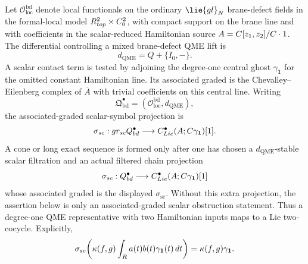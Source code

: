 \begin{defn}
\label{def:app-scalar-obstruction-complex}
  Let \(\mathcal O_{\mathrm{loc}}^{\mathrm{bd}}\) denote local
  functionals on the ordinary \(\lie{gl}_N\) brane-defect fields in the
  formal-local model
  \(R^2_{top}\times C^2_0\), with compact support on
  the brane line and with coefficients in the scalar-reduced Hamiltonian
  source \(A=C[z_1,z_2]/C\cdot1\).
  The differential controlling a mixed brane-defect QME lift is
  \[
    d_{\mathrm{QME}}=Q+\{I_0,-\}.
  \]
  A scalar contact term is tested by adjoining the degree-one central
  ghost \(\gamma_{\mathbf 1}\) for the omitted constant Hamiltonian
  line.  Its associated graded is the Chevalley--Eilenberg complex of
  \(\bar A\) with trivial coefficients on this central line.
  Writing
  \[
    \mathfrak Q^\bullet_{\mathrm{bd}}
      =(\mathcal O_{\mathrm{loc}}^{\mathrm{bd}},d_{\mathrm{QME}}),
  \]
  the associated-graded scalar-symbol projection is
  \[
    \sigma_{sc}:
    gr_{sc}Q^\bullet_{bd}
    \longrightarrow
    C^\bullet_{Lie}(A;C\gamma_{\mathbf 1})[1].
  \]
  A cone or long exact sequence is formed only after one has chosen a
  \(d_{\mathrm{QME}}\)-stable scalar filtration and an actual filtered
  chain projection
  \[
    \sigma_{sc}:
    Q^\bullet_{bd}
    \longrightarrow
    C^\bullet_{Lie}(A;C\gamma_{\mathbf 1})[1]
  \]
  whose associated graded is the displayed \(\sigma_{\mathrm{sc}}\).
  Without this extra projection, the assertion below is only an
  associated-graded scalar obstruction statement.
  Thus a degree-one QME representative with two Hamiltonian inputs maps to
  a Lie two-cocycle.  Explicitly,
  \[
    \sigma_{sc}\!\left(
    \kappa(f,g)\int_{R} a(t)b(t)\gamma_{\mathbf 1}(t)\,dt\right)
    =
    \kappa(f,g)\gamma_{\mathbf 1}.
  \]
\end{defn}

